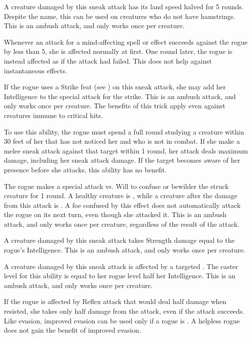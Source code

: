  A creature damaged by this sneak attack has its land speed halved for 5 rounds. Despite the name, this can be used on creatures who do not have hamstrings. This is an ambush attack, and only works once per creature.

 Whenever an attack for a mind-affecting spell or effect succeeds against the rogue by less than 5, she is affected normally at first. One round later, the rogue is instead affected as if the attack had failed. This does not help against instantaneous effects.

 If the rogue uses a Strike feat (see ) on this sneak attack, she may add her Intelligence to the special attack for the strike. This is an ambush attack, and only works once per creature. The benefits of this trick apply even against creatures immune to critical hits.

 To use this ability, the rogue must spend a full round studying a creature within 30 feet of her that has not noticed her and who is not in combat. If she make a melee sneak attack against that target within 1 round, her attack deals maximum damage, including her sneak attack damage. If the target becomes aware of her presence before she attacks, this ability has no benefit.

 The rogue makes a special attack vs. Will to confuse or bewilder the struck creature for 1 round. A healthy creature is \bewildered, while a creature \bloodied after the damage from this attack is \confused. A foe confused by this effect does not automatically attack the rogue on its next turn, even though she attacked it. This is an ambush attack, and only works once per creature, regardless of the result of the attack.

 A creature damaged by this sneak attack takes Strength damage equal to the rogue's Intelligence. This is an ambush attack, and only works once per creature.

 A creature damaged by this sneak attack is affected by a targeted . The caster level for this ability is equal to her rogue level \add half her Intelligence. This is an ambush attack, and only works once per creature.

 If the rogue is affected by Reflex attack that would deal half damage when resisted, she takes only half damage from the attack, even if the attack succeeds. Like evasion, improved evasion can be used only if a rogue is \unencumbered. A helpless rogue does not gain the benefit of improved evasion.

